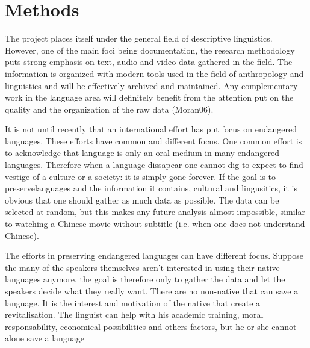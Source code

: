 \chapter{Methods}

 The project places itself under the general field of descriptive linguistics.
 However, one of the main foci being documentation, the research methodology
 puts strong emphasis on text, audio and video data gathered in the field. The
 information is organized with modern tools used in the field of anthropology
 and linguistics and will be effectively archived and maintained. Any
 complementary work in the language area will definitely benefit from the
 attention put on the quality and the organization of the raw data (Moran06).

It is not until recently that an international effort has put focus on endangered languages. These efforts have common and different focus. One common effort is to acknowledge that language is only an oral medium in many endangered languages. Therefore when a language dissapear one cannot dig to expect to find vestige of a culture or a society: it is simply gone forever. If the goal is to preservelanguages and the information it contains, cultural and lingusitics, it is obvious that one should gather as much data as possible. The data can be selected at random, but this makes any future analysis almost impossible, similar to watching a Chinese movie without subtitle (i.e. when one does not understand Chinese).


The efforts in preserving endangered languages can have different focus. Suppose the many of the speakers themselves aren't interested in using their native languages anymore, the goal is therefore only to gather the data and let the speakers decide what they really want. There are no non-native that can save a language. It is the interest and motivation of the native that create a revitalisation. The linguist can help with his academic training, moral responsability, economical possibilities and others factors, but he or she cannot alone save a language











